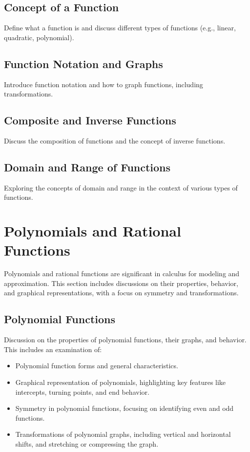 \documentclass[a4paper,12pt]{book}
\begin{document}
\subsection{Concept of a Function}
\label{subsec:concept_of_function}
Define what a function is and discuss different types of functions (e.g., linear, quadratic, polynomial).


\subsection{Function Notation and Graphs}
\label{subsec:function_notation_and_graphs}
Introduce function notation and how to graph functions, including transformations.


\subsection{Composite and Inverse Functions}
\label{subsec:composite_and_inverse_functions}
Discuss the composition of functions and the concept of inverse functions.


\subsection{Domain and Range of Functions}
\label{subsec:domain_range_functions}
Exploring the concepts of domain and range in the context of various types of functions.


\section{Polynomials and Rational Functions}
\label{sec:polynomials_and_rational}
Polynomials and rational functions are significant in calculus for modeling and approximation. This section includes discussions on their properties, behavior, and graphical representations, with a focus on symmetry and transformations.


\subsection{Polynomial Functions}
\label{subsec:polynomial_functions}
Discussion on the properties of polynomial functions, their graphs, and behavior. This includes an examination of:


\begin{itemize}
    \item Polynomial function forms and general characteristics.
    \item Graphical representation of polynomials, highlighting key features like intercepts, turning points, and end behavior.
    \item Symmetry in polynomial functions, focusing on identifying even and odd functions.
    \item Transformations of polynomial graphs, including vertical and horizontal shifts, and stretching or compressing the graph.
\end{itemize}
\end{document}
